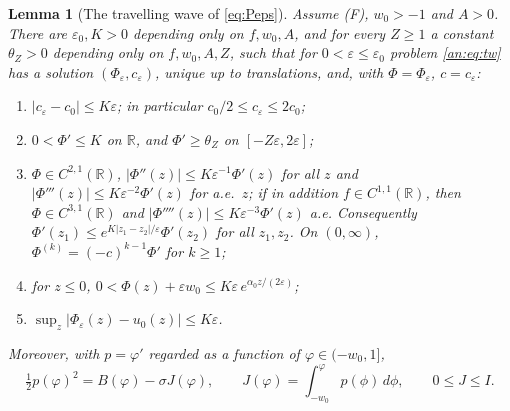 \documentclass[11pt]{amsart}
\newtheorem{lemma}[theorem]{Lemma}
\theoremstyle{definition}
\theoremstyle{remark}
\newcommand{\ve}{\varepsilon}
\newcommand{\R}{\mathbb{R}}
\begin{document}
\begin{lemma}[The travelling wave of \eqref{eq:Peps}]\label{an:lem:profile}
Assume (F), $w_0>-1$ and $A>0$. There are $\ve_0,K>0$ depending only on $f,w_0,A$,
and for every $Z\ge1$ a constant $\theta_Z>0$ depending only on $f,w_0,A,Z$, such
that for $0<\ve\le\ve_0$ problem \eqref{an:eq:tw} has a solution $(\Phi_\ve,c_\ve)$,
unique up to translations, and, with $\Phi=\Phi_\ve$, $c=c_\ve$:
\begin{enumerate}
\item $|c_\ve-c_0|\le K\ve$; in particular $c_0/2\le c_\ve\le 2c_0$;
\item $0<\Phi'\le K$ on $\R$, and $\Phi'\ge\theta_Z$ on $[-Z\ve,2\ve]$;
\item $\Phi\in C^{2,1}(\R)$, $|\Phi''(z)|\le K\ve^{-1}\Phi'(z)$ for all $z$ and
$|\Phi'''(z)|\le K\ve^{-2}\Phi'(z)$ for a.e.\ $z$; if in addition $f\in C^{1,1}(\R)$, then
$\Phi\in C^{3,1}(\R)$ and $|\Phi''''(z)|\le K\ve^{-3}\Phi'(z)$ a.e. Consequently
$\Phi'(z_1)\le e^{K|z_1-z_2|/\ve}\Phi'(z_2)$ for all $z_1,z_2$. On $(0,\infty)$,
$\Phi^{(k)}=(-c)^{k-1}\Phi'$ for $k\ge1$;
\item for $z\le0$, $0<\Phi(z)+\ve w_0\le K\ve\,e^{\alpha_0 z/(2\ve)}$;
\item $\sup_z|\Phi_\ve(z)-u_0(z)|\le K\ve$.
\end{enumerate}
Moreover, with $p=\varphi'$ regarded as a function of $\varphi\in(-w_0,1]$,
\begin{equation}\label{eq:energyphi}
\tfrac12p(\varphi)^2=B(\varphi)-\sigma J(\varphi),\qquad
J(\varphi)=\int_{-w_0}^{\varphi}p(\phi)\,d\phi ,\qquad 0\le J\le I .
\end{equation}
\end{lemma}
\end{document}
